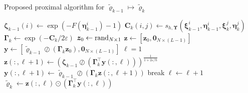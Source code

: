 \documentclass[10pt,twocolumn]{IEEEtran}
\begin{document}
\begin{algorithm}[t]
\caption{Proposed proximal algorithm for $\tilde{\bm{\varrho}}_{k-1}\mapsto\tilde{\bm{\varrho}}_{k}$}
\label{algo:KineticProx}
\begin{algorithmic}[1]
\State $\bm{\zeta}_{k-1}(i) \gets \exp\left(-F\left(\bm{\eta}_{k-1}^{i}\right)-1\right)$
\State $\bm{C}_{k}(i,j) \gets s_{h,\bm{\Upsilon}}\left(\bm{\xi}_{k-1}^{i},\bm{\eta}_{k-1}^{i},\bm{\xi}_{k}^{j},\bm{\eta}_{k}^{j}\right)$
\EndFor
\EndFor
\State $\bm{\Gamma}_{k} \gets \exp\left(-\bm{C}_{k}/2\varepsilon\right)$ 
\State $\bm{z}_{0} \gets {\rm{rand}}_{N\times 1}$ 
\State $\bm{z} \gets \left[\bm{z}_{0}, \bm{0}_{N\times(L-1)}\right]$ 
\State $\bm{y} \gets \left[\tilde{\bm{\varrho}}_{k-1}\oslash\left(\bm{\Gamma}_{k}\bm{z}_{0}\right), \bm{0}_{N\times(L-1)}\right]$ 
\State $\ell = 1$
\While{$\ell\leq \ell_{\max}$}
\State $\bm{z}(:,\ell+1) \gets \left(\bm{\zeta}_{k-1}\oslash\left(\bm{\Gamma}_{k}^{\top}\bm{y}(:,\ell)\right)\right)^{\frac{1}{1+2\varepsilon/h}}$
\State $\bm{y}(:,\ell+1) \gets \tilde{\bm{\varrho}}_{k-1} \oslash \left(\bm{\Gamma}_{k}\bm{z}(:,\ell+1)\right)$
 
\State break
\Else
\State $\ell \gets \ell + 1$
\EndIf
\EndWhile\\
\Return $\tilde{\bm{\varrho}}_{k} \gets \bm{z}(:,\ell) \odot \left(\bm{\Gamma}_{k}^{\top}\bm{y}(:,\ell)\right)$ 
\EndProcedure	
\end{algorithmic}
\end{algorithm}
\end{document}
